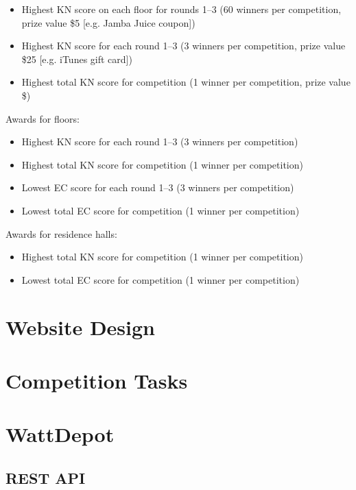 \begin{itemize}
	\item Highest KN score on each floor for rounds 1--3 (60 winners per competition, prize value \$5 [e.g. Jamba Juice coupon])
	\item Highest KN score for each round 1--3 (3 winners per competition, prize value \$25 [e.g. iTunes gift card])
	\item Highest total KN score for competition (1 winner per competition, prize value \$)
\end{itemize}

Awards for floors:

\begin{itemize}
	\item Highest KN score for each round 1--3 (3 winners per competition)
	\item Highest total KN score for competition (1 winner per competition)
	\item Lowest EC score for each round 1--3 (3 winners per competition)
	\item Lowest total EC score for competition (1 winner per competition)
\end{itemize}

Awards for residence halls:

\begin{itemize}
	\item Highest total KN score for competition (1 winner per competition)
	\item Lowest total EC score for competition (1 winner per competition)
\end{itemize}


\section{Website Design}
\label{sec:website-design}

\section{Competition Tasks}

\section{WattDepot}

\subsection{REST API}

